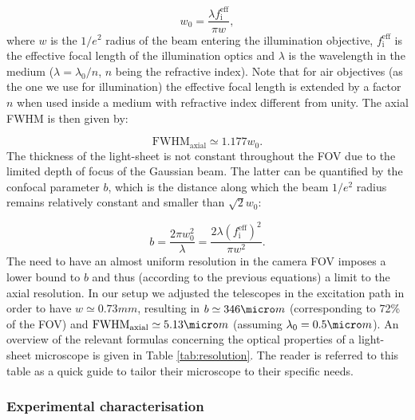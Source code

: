 \documentclass[12pt]{spieman}  %
\begin{document}
\begin{equation}
w_0 = \frac{\lambda f_{\text{i}}^{\text{eff}}}{\pi w},
\end{equation}
where $w$ is the $1/e^2$ radius of the beam entering the illumination objective, $ f_{\text{i}}^{\text{eff}}$ is the effective focal length of the illumination optics and $\lambda$ is the wavelength in the medium ($\lambda = \lambda_0 / n$, $n$ being the refractive index). Note that for air objectives (as the one we use for illumination) the effective focal length is extended by a factor $n$ when used inside a medium with refractive index different from unity\cite{Silvestri2012}.
The axial FWHM is then given by:

\begin{equation}
\text{FWHM}_{\text{axial}} \simeq 1.177 w_0.
\end{equation}
The thickness of the light-sheet is not constant throughout the FOV due to the limited depth of focus of the Gaussian beam. The latter can be quantified by the confocal parameter $b$, which is the distance along which the beam $1/e^2$ radius remains relatively constant and smaller than $\sqrt{2} w_0$:

\begin{equation}
b = \frac{2\pi w_0^2}{\lambda} = \frac{2 \lambda  {(f_{\text{i}}^{\text{eff}})}^2}{\pi w^2}.
\end{equation}
The need to have an almost uniform resolution in the camera FOV imposes a lower bound to $b$ and thus (according to the previous equations) a limit to the axial resolution. In our setup we adjusted the telescopes in the excitation path in order to have $w \simeq 0.73 mm$, resulting in $b \simeq 346 \micro m$ (corresponding to 72\% of the FOV) and $\text{FWHM}_{\text{axial}} \simeq 5.13 \micro m$ (assuming $\lambda_0 = 0.5 \micro m$). An overview of the relevant formulas concerning the optical properties of a light-sheet microscope is given in Table \ref{tab:resolution}. The reader is referred to this table as a quick guide to tailor their microscope to their specific needs.

\subsubsection{Experimental characterisation}
\end{document}
